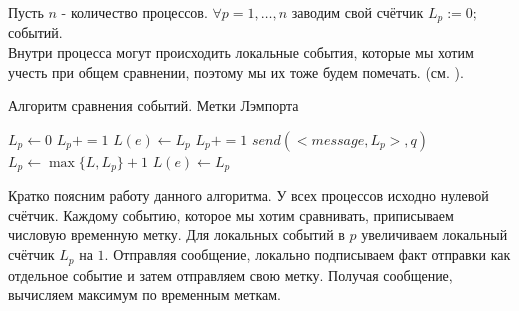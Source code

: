 Пусть $n$ - количество процессов. $\forall p = 1, \ldots, n$ заводим свой счётчик $L_p := 0;$ событий.\\
Внутри процесса могут происходить локальные события, которые мы хотим учесть при общем сравнении, поэтому мы их тоже будем помечать. (см. ).
\begin{algorithm}
\caption{Алгоритм сравнения событий. Метки Лэмпорта}
\label{algComparison}
\begin{algorithmic}
\State $L_p \gets 0$
{}
    \State $L_p += 1$
    \State $L(e) \gets L_p$ 
\EndIf
{}
    \State $L_p += 1$
    \State $send(<message, L_p>, q)$ 
\EndIf
{}
    \State $L_p \gets \max\{L,L_p\} + 1$
    \State $L(e) \gets L_p$ 
\EndIf
\EndFunction
\end{algorithmic}
\end{algorithm}
Кратко поясним работу данного алгоритма. У всех процессов исходно нулевой счётчик. Каждому событию, которое мы хотим сравнивать, приписываем числовую временную метку. Для локальных событий в $p$ увеличиваем локальный счётчик $L_p$ на $1$. Отправляя сообщение, локально подписываем факт отправки как отдельное событие и затем отправляем свою метку. Получая сообщение, вычисляем максимум по временным меткам.
